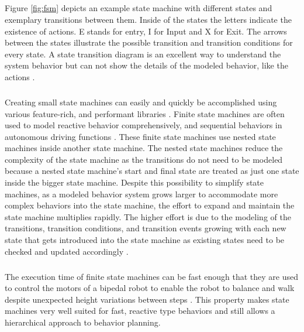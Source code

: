 \subparagraph*{}
Figure \ref{fig:fsm} depicts an example state machine with different states and exemplary transitions between them. Inside of the states the letters indicate the existence of actions. E stands for entry, I for Input and X for Exit. The arrows between the states illustrate the possible transition and transition conditions for every state. A state transition diagram is an excellent way to understand the system behavior but can not show the details of the modeled behavior, like the actions \cite{wagner2006}. 
\subparagraph*{}
Creating small state machines can easily and quickly be accomplished using various feature-rich, and performant libraries \cite{fourakis2014}. 
Finite state machines are often used to model reactive behavior comprehensively, and sequential behaviors in autonomous driving functions \cite{ziegler2014}. These finite state machines use nested state machines inside another state machine. The nested state machines reduce the complexity of the state machine as the transitions do not need to be modeled because a nested state machine's start and final state are treated as just one state inside the bigger state machine. Despite this possibility to simplify state machines, as a modeled behavior system grows larger to accommodate more complex behaviors into the state machine, the effort to expand and maintain the state machine multiplies rapidly. The higher effort is due to the modeling of the transitions, transition conditions, and transition events growing with each new state that gets introduced into the state machine as existing states need to be checked and updated accordingly \cite{conner2017}. 
\subparagraph*{}
The execution time of finite state machines can be fast enough that they are used to control the motors of a bipedal robot to enable the robot to balance and walk despite unexpected height variations between steps \cite{park2013}. This property makes state machines very well suited for fast, reactive type behaviors and still allows a hierarchical approach to behavior planning.


%

